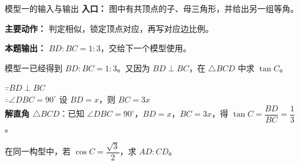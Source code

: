 \documentclass{exam-zh}
\begin{document}
\begin{eduSolutionBox}{模型一的输入与输出}
  \begingroup
  \setlength{\parskip}{2.5mm}
\textbf{入口：} 图中有共顶点的子、母三角形，并给出另一组等角。\par
\textbf{主要动作：} 判定相似，锁定顶点对应，再写对应边比例。\par
\textbf{本题输出：} $BD:BC=1:3$，交给下一个模型使用。\par
  \endgroup
\end{eduSolutionBox}




\begin{eduProblemBlock}[承接例题]
模型一已经得到 $BD:BC=1:3$。又因为 $BD\perp BC$，在
$\triangle BCD$ 中求 $\tan C$。

\end{eduProblemBlock}










\begin{eduDualExplain}
  \begin{eduExplainLeft}
  \end{eduExplainLeft}

  \begin{eduExplainRight}
$\because BD\perp BC$\\
$\therefore \angle DBC=90^\circ$
设 $BD=x$，则 $BC=3x$\\
\textbf{解直角 $\triangle BCD$}：已知 $\angle DBC=90^\circ$，$BD=x$，$BC=3x$，得 $\tan C=\dfrac{BD}{BC}=\dfrac13$。
  \end{eduExplainRight}
\end{eduDualExplain}




\begin{eduProblemBlock}[反向例题]
在同一构型中，若 $\cos C=\dfrac{\sqrt3}{2}$，求 $AD:CD$。

\end{eduProblemBlock}
\end{document}
